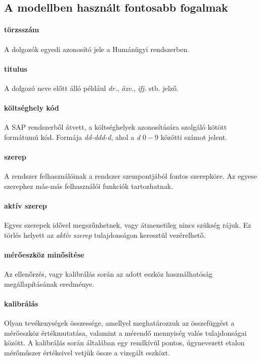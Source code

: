 
\subsection{A modellben használt fontosabb fogalmak}

\paragraph*{törzsszám} A dolgozók egyedi azonosító jele a Humánügyi rendszerben. 

\paragraph*{titulus} A dolgozó neve előtt álló például \textit{dr.}, \textit{özv.}, \textit{ifj.} stb.
jelző.

\paragraph*{költséghely kód} A SAP rendszerből átvett, a költséghelyek azonosítására 
szolgáló kötött formátumú kód. Formája \textit{dd-ddd-d}, ahol a \textit{d} $0-9$ közötti
számot jelent.

\paragraph*{szerep} A rendszer felhasználóinak a rendszer szempontjából fontos
szerepköre. Az egyese szerephez más-más felhasználói funkciók tartozhatnak.

\paragraph*{aktív szerep} Egyes szerepek idővel megszűnhetnek, vagy átmenetileg
nincs szükség rájuk. Ez törlés helyett az \textit{aktív szerep} tulajdonságon keresztül vezérelhető.

\paragraph*{mérőeszköz minősítése} Az ellenőrzés, vagy kalibrálás során az adott
eszköz használhatóság megállapításának eredménye.

\paragraph*{kalibrálás} Olyan tevékenységek összessége, amellyel meghatározzuk az
összefüggést a mérőeszköz értékmutatása, valamint a mérendő mennyiség valós
tulajdonságai között. A kalibrálás során általában egy rendkívül pontos, úgynevezett
etalon mérőműszer értékeivel vetjük össze a vizsgált eszközt.

